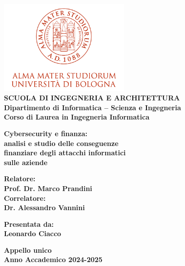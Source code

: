 \begin{titlepage}
\begin{center}
\includegraphics[width=2.56in]{figures/logo/logo_unibo.png}\\
\vspace{5mm}
{\small{\bf SCUOLA DI INGEGNERIA E ARCHITETTURA\\
\vspace{2mm}
Dipartimento di Informatica -- Scienza e Ingegneria\\
\vspace{2mm}
Corso di Laurea in Ingegneria Informatica }}
\end{center}
\vspace{3,8mm}
\begin{center}
{\LARGE{\bf Cybersecurity e finanza:\\
\vspace{3,5mm}
analisi e studio delle conseguenze\\
\vspace{3,5mm}
finanziare degli attacchi informatici\\
\vspace{3,5mm}
sulle aziende\\
\vspace{3,5mm}}}
  
\end{center}
\vspace{9,5mm}
\par
\noindent
\begin{minipage}[t]{0.47\textwidth}
{\normalsize{\bf Relatore:\\
Prof. Dr. Marco Prandini\\}}
{\normalsize{\bf Correlatore:\\
Dr. Alessandro Vannini}}
\end{minipage}
\hfill
\begin{minipage}[t]{0.47\textwidth}\raggedleft
{\normalsize{\bf Presentata da:\\
Leonardo Ciacco}}
\end{minipage}
\vspace{15mm} %
\begin{center}
{\normalsize{\bf Appello unico\\%
Anno Accademico 2024-2025}}%
\end{center}
\end{titlepage}
